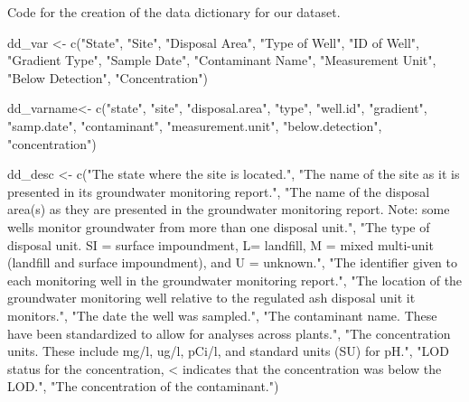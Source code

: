\documentclass[12pt, twoside]{amherstthesis}
\newenvironment{Shaded}{\begin{snugshade}}{\end{snugshade}}
\newcommand{\FunctionTok}[1]{\textcolor[rgb]{0.00,0.00,0.00}{#1}}
\newcommand{\NormalTok}[1]{#1}
\newcommand{\OtherTok}[1]{\textcolor[rgb]{0.56,0.35,0.01}{#1}}
\newcommand{\StringTok}[1]{\textcolor[rgb]{0.31,0.60,0.02}{#1}}
\begin{document}
Code for the creation of the data dictionary for our dataset.
\begin{Shaded}
\begin{Highlighting}[]
\NormalTok{dd\_var }\OtherTok{\textless{}{-}} \FunctionTok{c}\NormalTok{(}\StringTok{"State"}\NormalTok{, }\StringTok{"Site"}\NormalTok{, }\StringTok{"Disposal Area"}\NormalTok{, }\StringTok{"Type of Well"}\NormalTok{,}
            \StringTok{"ID of Well"}\NormalTok{, }\StringTok{"Gradient Type"}\NormalTok{, }
            \StringTok{"Sample Date"}\NormalTok{, }
            \StringTok{"Contaminant Name"}\NormalTok{, }\StringTok{"Measurement Unit"}\NormalTok{,}
            \StringTok{"Below Detection"}\NormalTok{, }\StringTok{"Concentration"}\NormalTok{)}

\NormalTok{dd\_varname}\OtherTok{\textless{}{-}} \FunctionTok{c}\NormalTok{(}\StringTok{"state"}\NormalTok{, }\StringTok{"site"}\NormalTok{, }\StringTok{"disposal.area"}\NormalTok{, }\StringTok{"type"}\NormalTok{, }\StringTok{"well.id"}\NormalTok{,}
             \StringTok{"gradient"}\NormalTok{, }\StringTok{"samp.date"}\NormalTok{, }\StringTok{"contaminant"}\NormalTok{,}
             \StringTok{"measurement.unit"}\NormalTok{, }\StringTok{"below.detection"}\NormalTok{,}
             \StringTok{"concentration"}\NormalTok{)}

\NormalTok{dd\_desc }\OtherTok{\textless{}{-}} \FunctionTok{c}\NormalTok{(}\StringTok{"The state where the site is located."}\NormalTok{,}
             \StringTok{"The name of the site as it is presented in its}
\StringTok{             groundwater monitoring report."}\NormalTok{,}
             \StringTok{"The name of the disposal area(s) as they are presented }
\StringTok{             in the groundwater monitoring report. Note: some wells }
\StringTok{             monitor groundwater from more than one disposal unit."}\NormalTok{,}
             \StringTok{"The type of disposal unit. SI = surface impoundment, }
\StringTok{             L= landfill, M = mixed multi{-}unit (landfill and surface }
\StringTok{             impoundment), and U = unknown."}\NormalTok{,}
             \StringTok{"The identifier given to each monitoring well in the }
\StringTok{             groundwater monitoring report."}\NormalTok{,}
             \StringTok{"The location of the groundwater monitoring well }
\StringTok{             relative to the regulated ash disposal unit it }
\StringTok{             monitors."}\NormalTok{,}
             \StringTok{"The date the well was sampled."}\NormalTok{,}
             \StringTok{"The contaminant name. These have been standardized to }
\StringTok{             allow for analyses across plants."}\NormalTok{,}
             \StringTok{"The concentration units. These include mg/l, ug/l, }
\StringTok{             pCi/l, and standard units (SU) for pH."}\NormalTok{,}
             \StringTok{"LOD status for the concentration, \textquotesingle{}\textless{}\textquotesingle{} indicates that }
\StringTok{             the concentration was below the LOD."}\NormalTok{,}
             \StringTok{"The concentration of the contaminant."}\NormalTok{)}


\end{Highlighting}
\end{Shaded}
\end{document}
